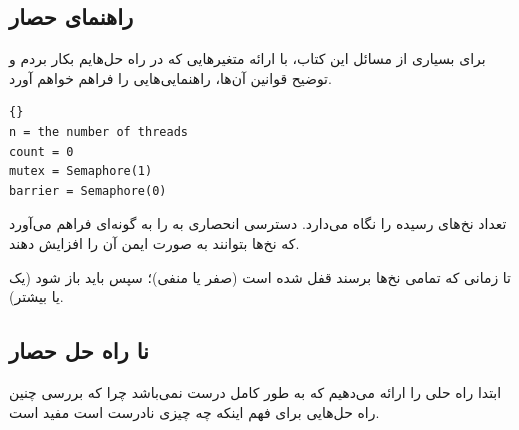 \documentclass{book}
\newcommand{\clearemptydoublepage}{\newpage\cleardoublepage}
\begin{document}
\clearemptydoublepage
\subsection {راهنمای حصار}


    برای بسیاری از مسائل این کتاب، با ارائه متغیرهایی که در راه  حل‌هایم  بکار بردم و توضیح قوانین آن‌ها، راهنمایی‌هایی را فراهم خواهم آورد. 

\begin{latin}
\begin{latin}
\begin{lstlisting}[title=\rl{راهنمای حصار}]{}
n = the number of threads
count = 0
mutex = Semaphore(1)
barrier = Semaphore(0)
\end{lstlisting}
\end{latin}
\end{latin}

     تعداد نخ‌های رسیده را نگاه می‌دارد. 
     دسترسی انحصاری به  را 
    به گونه‌ای فراهم می‌آورد که نخ‌ها بتوانند به صورت ایمن آن را افزایش دهند. 

    تا زمانی که تمامی نخ‌ها برسند قفل شده است (صفر یا منفی)؛ سپس باید باز شود (یک یا بیشتر). 

\clearemptydoublepage
\subsection {نا راه حل حصار}

    ابتدا راه حلی را ارائه می‌دهیم که به طور کامل درست نمی‌باشد چرا که بررسی چنین راه حل‌هایی برای فهم اینکه چه چیزی نادرست است مفید است.
\end{document}
